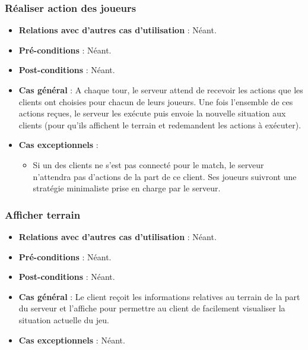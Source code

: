\documentclass[a4paper,titlepage]{scrreprt}
\begin{document}
    \subsubsection{Réaliser action des joueurs}
      \begin{itemize}
        \item \textbf{Relations avec d'autres cas d'utilisation}  : Néant.
        \item \textbf{Pré-conditions} : Néant.
        \item \textbf{Post-conditions} : Néant.
        \item \textbf{Cas général} : A chaque tour, le serveur attend de recevoir les actions que les clients ont choisies pour chacun de leurs joueurs. Une fois l’ensemble de ces actions reçues, le serveur les exécute puis envoie la nouvelle situation aux clients (pour qu’ils affichent le terrain et redemandent les actions à exécuter).
        \item \textbf{Cas exceptionnels} : 
          \begin{itemize}
            \item Si un des clients ne s’est pas connecté pour le match, le serveur n’attendra pas d’actions de la part de ce client. Ses joueurs suivront une stratégie minimaliste prise en charge par le serveur.
          \end{itemize}  
      \end{itemize}
    \subsubsection{Afficher terrain}
      \begin{itemize}
        \item \textbf{Relations avec d'autres cas d'utilisation}  : Néant.
        \item \textbf{Pré-conditions} : Néant.
        \item \textbf{Post-conditions} : Néant.
        \item \textbf{Cas général} : Le client reçoit les informations relatives au terrain de la part du serveur et l’affiche pour permettre au client de facilement visualiser la situation actuelle du jeu.
        \item \textbf{Cas exceptionnels} : Néant. 
      \end{itemize}
\end{document}
